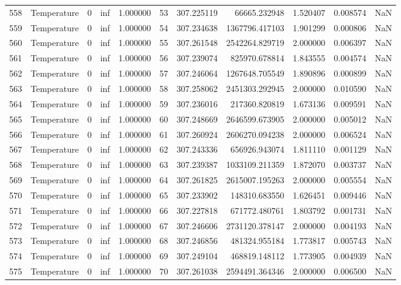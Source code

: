 \begin{tabular}{llrrrrrrrrr}
558 & Temperature & 0 & inf & 1.000000 & 53 & 307.225119 & 66665.232948 & 1.520407 & 0.008574 & NaN \\
559 & Temperature & 0 & inf & 1.000000 & 54 & 307.234638 & 1367796.417103 & 1.901299 & 0.000806 & NaN \\
560 & Temperature & 0 & inf & 1.000000 & 55 & 307.261548 & 2542264.829719 & 2.000000 & 0.006397 & NaN \\
561 & Temperature & 0 & inf & 1.000000 & 56 & 307.239074 & 825970.678814 & 1.843555 & 0.004574 & NaN \\
562 & Temperature & 0 & inf & 1.000000 & 57 & 307.246064 & 1267648.705549 & 1.890896 & 0.000899 & NaN \\
563 & Temperature & 0 & inf & 1.000000 & 58 & 307.258062 & 2451303.292945 & 2.000000 & 0.010590 & NaN \\
564 & Temperature & 0 & inf & 1.000000 & 59 & 307.236016 & 217360.820819 & 1.673136 & 0.009591 & NaN \\
565 & Temperature & 0 & inf & 1.000000 & 60 & 307.248669 & 2646599.673905 & 2.000000 & 0.005012 & NaN \\
566 & Temperature & 0 & inf & 1.000000 & 61 & 307.260924 & 2606270.094238 & 2.000000 & 0.006524 & NaN \\
567 & Temperature & 0 & inf & 1.000000 & 62 & 307.243336 & 656926.943074 & 1.811110 & 0.001129 & NaN \\
568 & Temperature & 0 & inf & 1.000000 & 63 & 307.239387 & 1033109.211359 & 1.872070 & 0.003737 & NaN \\
569 & Temperature & 0 & inf & 1.000000 & 64 & 307.261825 & 2615007.195263 & 2.000000 & 0.005554 & NaN \\
570 & Temperature & 0 & inf & 1.000000 & 65 & 307.233902 & 148310.683550 & 1.626451 & 0.009446 & NaN \\
571 & Temperature & 0 & inf & 1.000000 & 66 & 307.227818 & 671772.480761 & 1.803792 & 0.001731 & NaN \\
572 & Temperature & 0 & inf & 1.000000 & 67 & 307.246606 & 2731120.378147 & 2.000000 & 0.004193 & NaN \\
573 & Temperature & 0 & inf & 1.000000 & 68 & 307.246856 & 481324.955184 & 1.773817 & 0.005743 & NaN \\
574 & Temperature & 0 & inf & 1.000000 & 69 & 307.249104 & 468819.148112 & 1.773905 & 0.004939 & NaN \\
575 & Temperature & 0 & inf & 1.000000 & 70 & 307.261038 & 2594491.364346 & 2.000000 & 0.006500 & NaN \\

\end{tabular}
